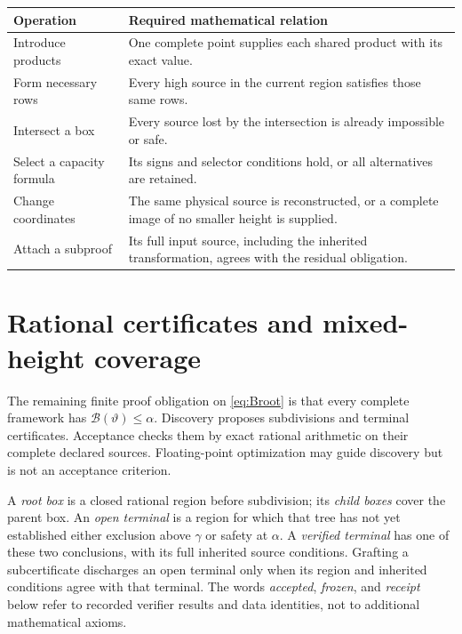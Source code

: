 \documentclass[11pt,reqno]{amsart}
\theoremstyle{definition}
\theoremstyle{remark}
\newcommand{\gam}{\gamma}
\newcommand{\cB}{\mathcal B}
\begin{document}
\begin{center}
\small
\begin{tabular}{@{}>{\raggedright\arraybackslash}p{.24\linewidth}>{\raggedright\arraybackslash}p{.67\linewidth}@{}}
\toprule
Operation&Required mathematical relation\\
\midrule
Introduce products&One complete point supplies each shared product with its exact value.\\
Form necessary rows&Every high source in the current region satisfies those same rows.\\
Intersect a box&Every source lost by the intersection is already impossible or safe.\\
Select a capacity formula&Its signs and selector conditions hold, or all alternatives are retained.\\
Change coordinates&The same physical source is reconstructed, or a complete image of no smaller height is supplied.\\
Attach a subproof&Its full input source, including the inherited transformation, agrees with the residual obligation.\\
\bottomrule
\end{tabular}
\end{center}


\section{Rational certificates and mixed-height coverage}
\label{sec:certificates}

The remaining finite proof obligation on \eqref{eq:Broot} is that every
complete framework has \(\cB(\vartheta)\le\alpha\).
Discovery proposes subdivisions and terminal certificates.
Acceptance checks them by exact rational arithmetic on their
complete declared sources. Floating-point optimization may guide
discovery but is not an acceptance criterion.

A \emph{root box} is a closed rational region before subdivision; its
\emph{child boxes} cover the parent box. An \emph{open terminal} is a
region for which that tree has not yet established either exclusion
above \(\gam\) or safety at \(\alpha\). A \emph{verified terminal}
has one of these two conclusions, with its full inherited source
conditions. Grafting a subcertificate discharges an open terminal only
when its region and inherited conditions agree with that terminal.
The words \emph{accepted}, \emph{frozen}, and \emph{receipt} below refer
to recorded verifier results and data identities, not to additional
mathematical axioms.
\end{document}
